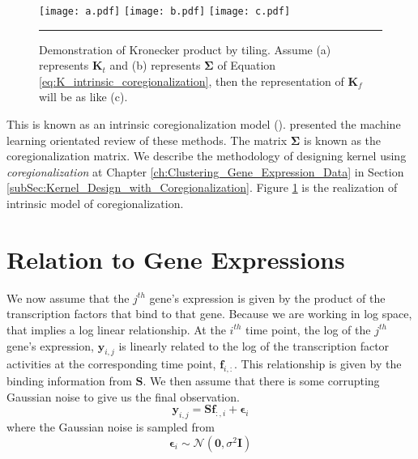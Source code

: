 \begin{figure}[t]
	\centering
		\texttt{[image: a.pdf]}
		\texttt{[image: b.pdf]}
		\texttt{[image: c.pdf]}
		\rule{35em}{0.5pt}
	\caption[Demonstration of Kronecker product by tiling]{Demonstration of Kronecker product by tiling. Assume (a) represents $\textbf{K}_t$ and (b) represents $\boldsymbol{\Sigma}$ of Equation \ref{eq:K_intrinsic_coregionalization}, then the representation of $\textbf{K}_f$ will be as like (c).}
	\label{fig:kron_prod}
\end{figure}
This is known as an intrinsic coregionalization model (\cite{Wackernagel:2003}). \cite{Alvarez:2012} presented the machine learning orientated review of these methods. The matrix $\boldsymbol{\Sigma}$ is known as the coregionalization matrix. We describe the methodology of designing kernel using \emph{coregionalization} at Chapter \ref{ch:Clustering_Gene_Expression_Data} in Section \ref{subSec:Kernel_Design_with_Coregionalization}. Figure \ref{fig:kron_prod} is the realization of intrinsic model of coregionalization.

\section{Relation to Gene Expressions}
We now assume that the $j^{th}$ gene's expression is given by the product of the transcription factors that bind to that gene. Because we are working in log space, that implies a log linear relationship. At the $i^{th}$ time point, the log of the $j^{th}$ gene's expression, $\mathbf{y}_{i,j}$ is linearly related to the log of the transcription factor activities at the corresponding time point, $\mathbf{f}_{i, :}$. This relationship is given by the binding information from $\mathbf{S}$. We then assume that there is some corrupting Gaussian noise to give us the final observation.
\begin{equation} \label{eq:yij}
  \mathbf{y}_{i, j} = \mathbf{S}\mathbf{f}_{:, i} + \boldsymbol{\epsilon}_i
\end{equation}  
where the Gaussian noise is sampled from
\begin{equation} \label{eq:epsi}
  \boldsymbol{\epsilon}_i \sim \mathcal{N}(\mathbf{0}, \sigma^2 \mathbf{I})
\end{equation}

